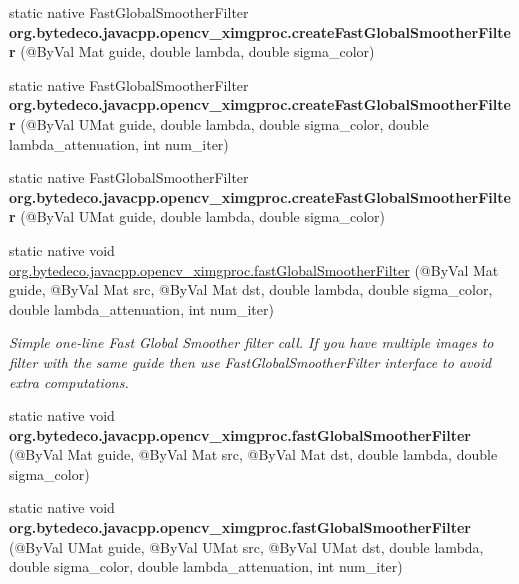 \begin{DoxyCompactItemize}
\mbox{\label{group__ximgproc__filters_gae354800aae185aef69579b16cbd22979}} 
static native Fast\+Global\+Smoother\+Filter {\bfseries org.\+bytedeco.\+javacpp.\+opencv\+\_\+ximgproc.\+create\+Fast\+Global\+Smoother\+Filter} (@By\+Val Mat guide, double lambda, double sigma\+\_\+color)
\item 
\mbox{\label{group__ximgproc__filters_gae8acd065f39006da4cb8ee9b9d6c5c52}} 
static native Fast\+Global\+Smoother\+Filter {\bfseries org.\+bytedeco.\+javacpp.\+opencv\+\_\+ximgproc.\+create\+Fast\+Global\+Smoother\+Filter} (@By\+Val U\+Mat guide, double lambda, double sigma\+\_\+color, double lambda\+\_\+attenuation, int num\+\_\+iter)
\item 
\mbox{\label{group__ximgproc__filters_gab2efc26d9beaf8a1fa69b7d0507d99c8}} 
static native Fast\+Global\+Smoother\+Filter {\bfseries org.\+bytedeco.\+javacpp.\+opencv\+\_\+ximgproc.\+create\+Fast\+Global\+Smoother\+Filter} (@By\+Val U\+Mat guide, double lambda, double sigma\+\_\+color)
\item 
static native void \hyperlink{group__ximgproc__filters_gad387c802487ca58e07a45c896a13688f}{org.\+bytedeco.\+javacpp.\+opencv\+\_\+ximgproc.\+fast\+Global\+Smoother\+Filter} (@By\+Val Mat guide, @By\+Val Mat src, @By\+Val Mat dst, double lambda, double sigma\+\_\+color, double lambda\+\_\+attenuation, int num\+\_\+iter)
\begin{DoxyCompactList}\small\item\em Simple one-\/line Fast Global Smoother filter call. If you have multiple images to filter with the same guide then use Fast\+Global\+Smoother\+Filter interface to avoid extra computations. \end{DoxyCompactList}\item 
\mbox{\label{group__ximgproc__filters_ga813fdfce933a9e9c58072ebcc89fef18}} 
static native void {\bfseries org.\+bytedeco.\+javacpp.\+opencv\+\_\+ximgproc.\+fast\+Global\+Smoother\+Filter} (@By\+Val Mat guide, @By\+Val Mat src, @By\+Val Mat dst, double lambda, double sigma\+\_\+color)
\item 
\mbox{\label{group__ximgproc__filters_gafd88e7ec3f59c9f97b646e562260e4a3}} 
static native void {\bfseries org.\+bytedeco.\+javacpp.\+opencv\+\_\+ximgproc.\+fast\+Global\+Smoother\+Filter} (@By\+Val U\+Mat guide, @By\+Val U\+Mat src, @By\+Val U\+Mat dst, double lambda, double sigma\+\_\+color, double lambda\+\_\+attenuation, int num\+\_\+iter)

\end{DoxyCompactItemize}
